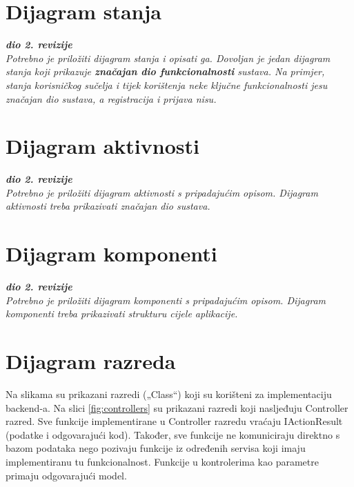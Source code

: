 			\eject
			
			\pagebreak
			
			\section{Dijagram stanja}
			
			\textbf{\textit{dio 2. revizije}}\\
			
			\textit{Potrebno je priložiti dijagram stanja i opisati ga. Dovoljan je jedan dijagram stanja koji prikazuje \textbf{značajan dio funkcionalnosti} sustava. Na primjer, stanja korisničkog sučelja i tijek korištenja neke ključne funkcionalnosti jesu značajan dio sustava, a registracija i prijava nisu. }
			
			
			\eject 
			
			\section{Dijagram aktivnosti}
			
			\textbf{\textit{dio 2. revizije}}\\
			
			\textit{Potrebno je priložiti dijagram aktivnosti s pripadajućim opisom. Dijagram aktivnosti treba prikazivati značajan dio sustava.}
			
			\eject
			\section{Dijagram komponenti}
			
			\textbf{\textit{dio 2. revizije}}\\
			
			\textit{Potrebno je priložiti dijagram komponenti s pripadajućim opisom. Dijagram komponenti treba prikazivati strukturu cijele aplikacije.}
			
			
		\section{Dijagram razreda} 
			
			{ Na slikama su prikazani razredi („Class“) koji su korišteni za implementaciju backend-a. Na slici \ref{fig:controllers} su prikazani razredi koji nasljeđuju Controller razred. Sve funkcije implementirane u Controller razredu vraćaju IActionResult (podatke i odgovarajući kod). Također, sve funkcije ne komuniciraju direktno s bazom podataka nego pozivaju funkcije iz određenih servisa koji imaju implementiranu tu funkcionalnost. Funkcije u kontrolerima kao parametre primaju odgovarajući model. }
			
